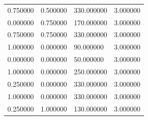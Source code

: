 \documentclass[12pt]{report}
\begin{document}
\begin{center}
\begin{table}[h!]
\begin{center}
\begin{tabular}{|llll|}
				0.750000                      & 0.500000                   & 330.000000                & 3.000000 \\
				0.000000                      & 0.750000                   & 170.000000                & 3.000000 \\
				0.750000                      & 0.750000                   & 330.000000                & 3.000000 \\
				1.000000                      & 0.000000                   & 90.000000                 & 3.000000 \\
				0.000000                      & 0.000000                   & 50.000000                 & 3.000000 \\
				1.000000                      & 0.000000                   & 250.000000                & 3.000000 \\
				0.250000                      & 0.000000                   & 330.000000                & 3.000000 \\
				1.000000                      & 0.000000                   & 330.000000                & 3.000000 \\
				0.250000                      & 1.000000                   & 130.000000                & 3.000000 \\ \hline
			\end{tabular}
		\end{center}
	\end{table}
	
\end{center}

\newpage
\end{document}
